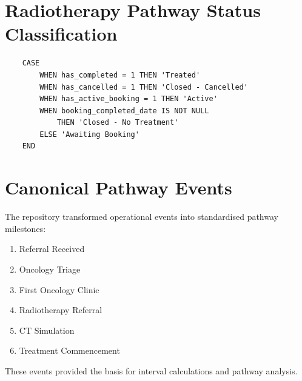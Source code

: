 \section{Radiotherapy Pathway Status Classification} 

\begin{verbatim} 
    CASE 
        WHEN has_completed = 1 THEN 'Treated' 
        WHEN has_cancelled = 1 THEN 'Closed - Cancelled' 
        WHEN has_active_booking = 1 THEN 'Active' 
        WHEN booking_completed_date IS NOT NULL 
            THEN 'Closed - No Treatment' 
        ELSE 'Awaiting Booking' 
    END 
\end{verbatim}

\section{Canonical Pathway Events} 

The repository transformed operational events into standardised pathway milestones: 

\begin{enumerate} 
    \item Referral Received 
    \item Oncology Triage 
    \item First Oncology Clinic 
    \item Radiotherapy Referral 
    \item CT Simulation 
    \item Treatment Commencement 
\end{enumerate} 

These events provided the basis for interval calculations and pathway analysis.
